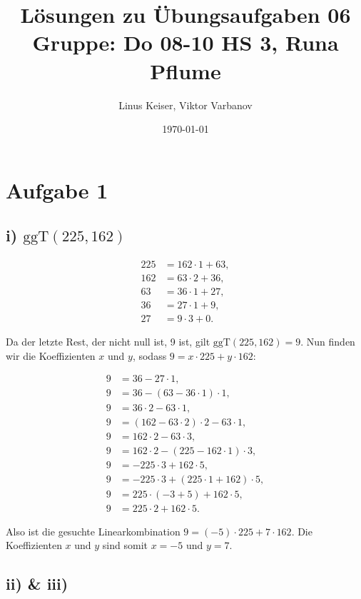 \documentclass{article}
\title{Lösungen zu Übungsaufgaben 06 \\ \small Gruppe: Do 08-10 HS 3, Runa Pflume}
\author{Linus Keiser, Viktor Varbanov}
\date{\today}
\begin{document}
\maketitle


\section*{Aufgabe 1}

\subsection*{i) \( \text{ggT}(225, 162) \)}

\begin{align*}
	225 & = 162 \cdot 1 + 63, \\
	162 & = 63 \cdot 2 + 36,  \\
	63  & = 36 \cdot 1 + 27,  \\
	36  & = 27 \cdot 1 + 9,   \\
	27  & = 9 \cdot 3 + 0.
\end{align*}

Da der letzte Rest, der nicht null ist, 9 ist, gilt \( \text{ggT}(225, 162) = 9 \). Nun finden wir die Koeffizienten \( x \) und \( y \), sodass \( 9 = x \cdot 225 + y \cdot 162 \):

\begin{align*}
	9 & = 36 - 27 \cdot 1,                            \\
	9 & = 36 - (63 - 36 \cdot 1) \cdot 1,             \\
	9 & = 36 \cdot 2 - 63 \cdot 1,                    \\
	9 & = (162 - 63 \cdot 2) \cdot 2 - 63 \cdot 1,    \\
	9 & = 162 \cdot 2 - 63 \cdot 3,                   \\
	9 & = 162 \cdot 2 - (225 - 162 \cdot 1) \cdot 3,  \\
	9 & = -225 \cdot 3 + 162 \cdot 5,                 \\
	9 & = -225 \cdot 3 + (225 \cdot 1 + 162) \cdot 5, \\
	9 & = 225 \cdot (-3 + 5) + 162 \cdot 5,           \\
	9 & = 225 \cdot 2 + 162 \cdot 5.
\end{align*}

Also ist die gesuchte Linearkombination \( 9 = (-5) \cdot 225 + 7 \cdot 162 \). Die Koeffizienten \( x \) und \( y \) sind somit \( x = -5 \) und \( y = 7 \).

\subsection*{ii) \& iii)}
\end{document}
